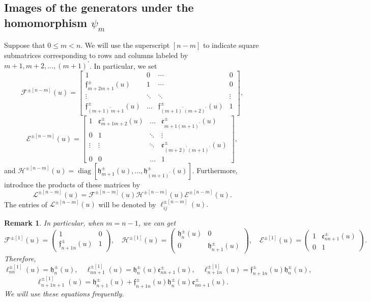 \documentclass[10pt,a4paper]{amsart}
\newtheorem{remark}[theorem]{Remark}
\numberwithin{equation}{section}
\begin{document}
		\subsection{Images of the generators under the homomorphism $\psi_m$}%
		Suppose that $0 \leqslant m<n$. We will use the superscript $[n-m]$ to indicate square submatrices corresponding to rows and columns labeled by $m+1, m+2, \ldots,(m+1)^{\prime}$.  In particular, we set
		$$
		\mathcal{F}^{ \pm[n-m]}(u)=\left[\begin{array}{cccc}
			1 & 0 & \cdots & 0 \\
			\mathfrak{f}_{m+2 m+1}^{ \pm}(u) & 1 & \cdots & 0 \\
			\vdots & \ddots & \ddots & \vdots \\
			\mathfrak{f}_{(m+1)^{\prime} m+1}^{ \pm}(u) & \ldots & \mathfrak{f}_{(m+1)^{\prime}(m+2)^{\prime}}^{ \pm}(u) & 1
		\end{array}\right],
		$$
		$$
		\mathcal{E}^{ \pm[n-m]}(u)=\left[\begin{array}{cccc}
			1 & \mathfrak{e}_{m+1 m+2}^{ \pm}(u) & \ldots & \mathfrak{e}_{m+1(m+1)^{\prime}}^{ \pm}(u) \\
			0 & 1 & \ddots & \vdots \\
			\vdots & \vdots & \ddots & \mathfrak{e}_{(m+2)^{\prime}(m+1)^{\prime}}^{ \pm}(u) \\
			0 & 0 & \ldots & 1
		\end{array}\right],
		$$
		and $\mathcal{H}^{ \pm[n-m]}(u)=\operatorname{diag}\left[\mathfrak{h}_{m+1}^{ \pm}(u), \ldots, \mathfrak{h}_{(m+1)^{\prime}}^{ \pm}(u)\right].$ Furthermore, introduce the products of these matrices by
		$$
		\mathcal{L}^{ \pm[n-m]}(u)=\mathcal{F}^{ \pm[n-m]}(u) \mathcal{H}^{ \pm[n-m]}(u) \mathcal{E}^{ \pm[n-m]}(u).
		$$
		The entries of $\mathcal{L}^{ \pm[n-m]}(u)$ will be denoted by $\ell_{i j}^{ \pm[n-m]}(u).$
	\begin{remark}
		In particular, when $m=n-1$, we can get
		$$
		\mathcal{F}^{ \pm[1]}(u)=\left(\begin{array}{cc}
			1 & 0 \\
			\mathfrak{f}_{n+1 n}^{ \pm}(u) & 1
		\end{array}\right), \quad \mathcal{H}^{ \pm[1]}(u)=\left(\begin{array}{cc}
			\mathfrak{h}_n^{ \pm}(u) & 0 \\
			0 & \mathfrak{h}_{n+1}^{ \pm}(u)
		\end{array}\right), \quad \mathcal{E}^{ \pm[1]}(u)=\left(\begin{array}{cc}
			1 & \mathfrak{e}_{n n+1}^{ \pm}(u) \\
			0 & 1
		\end{array}\right).
		$$
		Therefore,
		$$
		\ell_{n n}^{ \pm[1]}(u)=\mathfrak{h}_n^{ \pm}(u), \quad \ell_{n n+1}^{ \pm[1]}(u)=\mathfrak{h}_n^{ \pm}(u) \mathfrak{e}_{n n+1}^{ \pm}(u), \quad \ell_{n+1 n}^{ \pm[1]}(u)=\mathfrak{f}_{n+1 n}^{ \pm}(u) \mathfrak{h}_n^{ \pm}(u),
		$$
		$$
		\ell_{n+1 n+1}^{ \pm[1]}(u)=\mathfrak{h}_{n+1}^{ \pm}(u)+\mathfrak{f}_{n+1 n}^{ \pm}(u) \mathfrak{h}_n^{ \pm}(u) \mathfrak{e}_{n n+1}^{ \pm}(u).
		$$
		We will use these equations frequently.
	\end{remark}
\end{document}
